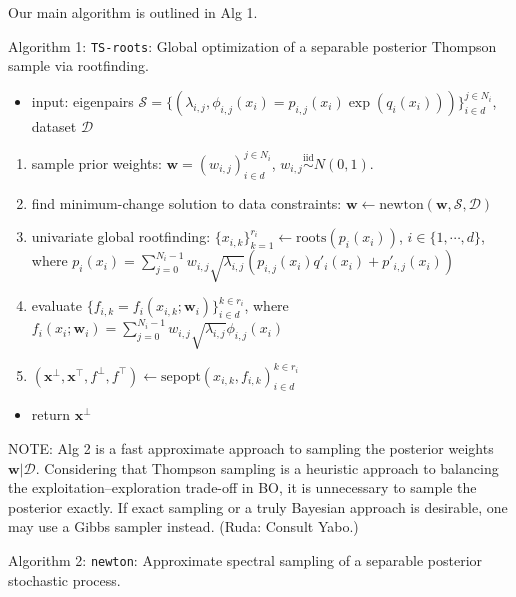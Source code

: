 \documentclass{article}
\newcommand{\cmtR}[1]{\textcolor{red!50!black}{(Ruda: #1)}} %
\begin{document}
Our main algorithm is outlined in Alg 1.

Algorithm 1: \texttt{TS-roots}: Global optimization of a separable
posterior Thompson sample via rootfinding.

\begin{itemize}
\item
  input: eigenpairs
  $\mathcal{S} = \{(\lambda_{i,j}, \phi_{i,j}(x_i) = p_{i,j}(x_i) \exp(q_i(x_i)))\}_{i \in d}^{j \in N_i}$,
  dataset $\mathcal{D}$
\end{itemize}

\begin{enumerate}
\def\labelenumi{\arabic{enumi}.}
\item
  sample prior weights:
  $\mathbf{w} = (w_{i,j})_{i \in d}^{j \in N_i}$,
  $w_{i,j} \overset{\text{iid}}{\sim} N(0, 1)$.
\item
  find minimum-change solution to data constraints:
  $\mathbf{w} \gets \mathrm{newton}(\mathbf{w}, \mathcal{S}, \mathcal{D})$
\item
  univariate global rootfinding:
  $\{x_{i,k}\}_{k=1}^{r_i} \gets \mathrm{roots}(p_i(x_i))$,
  $i \in \{1, \cdots, d\}$, where
  $p_i(x_i) = \sum_{j=0}^{N_i - 1} w_{i,j} \sqrt{\lambda_{i,j}} (p_{i,j}(x_i) q'_i(x_i) + p'_{i,j}(x_i))$
\item
  evaluate
  $\{f_{i,k} = f_i(x_{i,k}; \mathbf{w}_i)\}_{i \in d}^{k \in r_i}$,
  where
  $f_i(x_i; \mathbf{w}_i) = \sum_{j=0}^{N_i - 1} w_{i,j} \sqrt{\lambda_{i,j}} \phi_{i,j}(x_i)$
\item
  $(\mathbf{x}^\bot, \mathbf{x}^\top, f^\bot, f^\top) \gets \mathrm{sepopt}(x_{i,k}, f_{i,k})_{i \in d}^{k \in r_i}$
\end{enumerate}

\begin{itemize}

\item
  return $\mathbf{x}^\bot$
\end{itemize}

NOTE: Alg 2 is a fast approximate approach to sampling the posterior
weights $\mathbf{w} | \mathcal{D}$. Considering that Thompson sampling
is a heuristic approach to balancing the exploitation--exploration
trade-off in BO, it is unnecessary to sample the posterior exactly. If
exact sampling or a truly Bayesian approach is desirable, one may use a
Gibbs sampler instead. \cmtR{Consult Yabo.}

Algorithm 2: \texttt{newton}: Approximate spectral sampling of a
separable posterior stochastic process.
\end{document}
